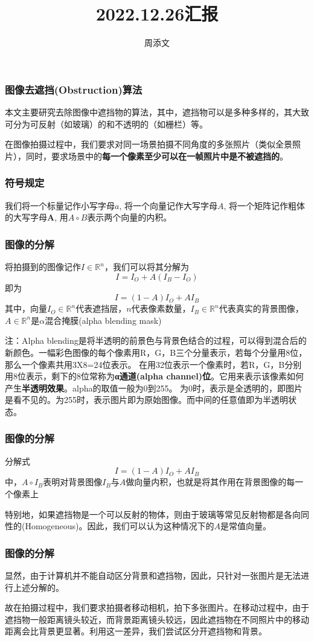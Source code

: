 \documentclass{beamer}
\title[2022.12.26日汇报] %
{2022.12.26汇报}
\author[周添文] %
{周添文\inst{} }
\institute[] %
{
  \inst{}%
  数学科学学院\\
  北京师范大学\\
}
\date[2022.12.26] %
\begin{document}
\frame{\titlepage}
\begin{frame}
\frametitle{图像去遮挡(Obstruction)算法}
本文主要研究去除图像中遮挡物的算法，其中，遮挡物可以是多种多样的，其大致可分为可反射（如玻璃）的和不透明的（如栅栏）等。\pause

在图像拍摄过程中，我们要求对同一场景拍摄不同角度的多张照片（类似全景照片），同时，要求场景中的\textbf{每一个像素至少可以在一帧照片中是不被遮挡的}。
\end{frame}
\begin{frame}
\frametitle{符号规定}
我们将一个标量记作小写字母$a$, 将一个向量记作大写字母$A$, 将一个矩阵记作粗体的大写字母$\textbf{A}$, 用$A\circ B$表示两个向量的内积。
\end{frame}
\begin{frame}
\frametitle{图像的分解}
将拍摄到的图像记作$I\in\mathbb{R}^n$，我们可以将其分解为
\begin{equation}
I = I_O + A(I_B - I_O)
\end{equation}
即为
\begin{equation}
I = (1-A)I_O+AI_B
\end{equation}
其中，向量$I_O\in \mathbb{R}^n$代表遮挡层，$n$代表像素数量，$I_B\in \mathbb{R}^n$代表真实的背景图像，$A\in \mathbb{R}^n$是$\alpha$混合掩膜(alpha blending mask)\pause

注：Alpha blending是将半透明的前景色与背景色结合的过程，可以得到混合后的新颜色。一幅彩色图像的每个像素用R，G，B三个分量表示，若每个分量用8位，那么一个像素共用3X8=24位表示。 在用32位表示一个像素时，若R，G，B分别用8位表示，剩下的8位常称为\textbf{α通道(alpha channel)位}。它用来表示该像素如何产生\textbf{半透明效果}。alpha的取值一般为0到255。 为0时，表示是全透明的，即图片是看不见的。为255时，表示图片即为原始图像。而中间的任意值即为半透明状态。
\end{frame}
\begin{frame}
\frametitle{图像的分解}
分解式
\begin{equation}
I = (1-A)I_O+AI_B
\end{equation}
中，$A\circ I_B$表明对背景图像$I_B$与$A$做向量内积，也就是将其作用在背景图像的每一个像素上\pause

特别地，如果遮挡物是一个可以反射的物体，则由于玻璃等常见反射物都是各向同性的(Homogeneous)。因此，我们可以认为这种情况下的$A$是常值向量。
\end{frame}
\begin{frame}
\frametitle{图像的分解}
显然，由于计算机并不能自动区分背景和遮挡物，因此，只针对一张图片是无法进行上述分解的。\pause

故在拍摄过程中，我们要求拍摄者移动相机，拍下多张图片。在移动过程中，由于遮挡物一般距离镜头较近，而背景距离镜头较远，因此遮挡物在不同照片中的移动距离会比背景更显著。利用这一差异，我们尝试区分开遮挡物和背景。
\end{frame}
\end{document}
